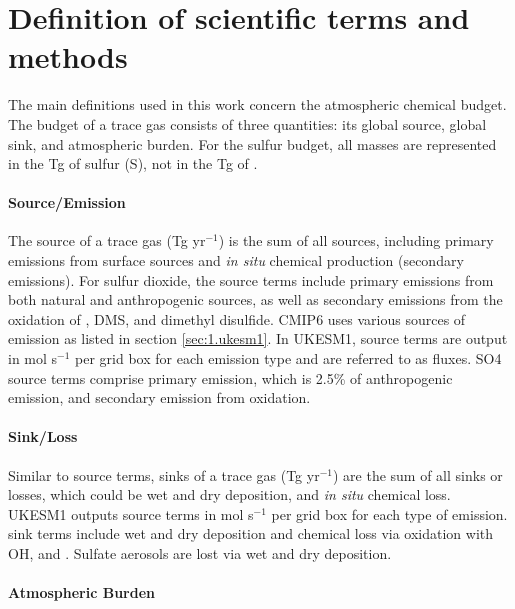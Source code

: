 
\chapter{Definition of scientific terms and methods}
\label{app:sec:defs_terms}

The main definitions used in this work concern the atmospheric chemical budget. The budget of a trace gas consists of three quantities: its global source, global sink, and atmospheric burden. For the sulfur budget, all masses are represented in the Tg of sulfur (S), not in the Tg of .

\subsubsection{Source/Emission}

The source of a trace gas (Tg yr$^{-1}$) is the sum of all sources, including primary emissions from surface sources and \textit{in situ} chemical production (secondary emissions). For sulfur dioxide, the source terms include primary emissions from both natural and anthropogenic sources, as well as secondary emissions from the oxidation of , DMS, and dimethyl disulfide. CMIP6 uses various sources of  emission as listed in section \ref{sec:1.ukesm1}. In UKESM1, source terms are output in mol s$^{-1}$ per grid box for each emission type and are referred to as fluxes. SO4 source terms comprise primary emission, which is 2.5\% of anthropogenic  emission, and secondary emission from  oxidation.

\subsubsection{Sink/Loss}

Similar to source terms, sinks of a trace gas (Tg yr$^{-1}$) are the sum of all sinks or losses, which could be wet and dry deposition, and \textit{in situ} chemical loss. UKESM1 outputs source terms in mol s$^{-1}$ per grid box for each type of emission.  sink terms include wet and dry deposition and chemical loss via oxidation with OH,  and . Sulfate aerosols are lost via wet and dry deposition.

\subsubsection{Atmospheric Burden}


